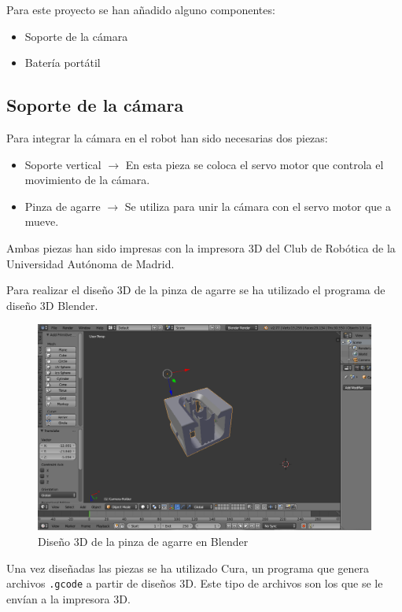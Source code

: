 \documentclass[twoside, 11pt]{epstfg}
\begin{document}
Para este proyecto se han añadido alguno componentes:

\begin{itemize}
	\item Soporte de la cámara
	\item Batería portátil
\end{itemize}

\subsection{Soporte de la cámara}

Para integrar la cámara en el robot han sido necesarias dos piezas:

\begin{itemize}
	\item Soporte vertical $\rightarrow$ En esta pieza se coloca el servo motor que controla el movimiento de la cámara.
	
	\item Pinza de agarre $\rightarrow$ Se utiliza para unir la cámara con el servo motor que a mueve.
\end{itemize}

Ambas piezas han sido impresas con la impresora 3D del Club de Robótica de la Universidad Autónoma de Madrid.

Para realizar el diseño 3D de la pinza de agarre se ha utilizado el programa de diseño 3D Blender.


\begin{figure}[h]
	\centerline{
		\mbox{\includegraphics[width=.80\textwidth]{images/cameraBlender.png}}
	}
	\caption{ Diseño 3D de la pinza de agarre en Blender}
\end{figure}

Una vez diseñadas las piezas se ha utilizado Cura, un programa que genera archivos \texttt{.gcode} a partir de diseños 3D. Este tipo de archivos son los que se le envían a la impresora 3D.
\end{document}
